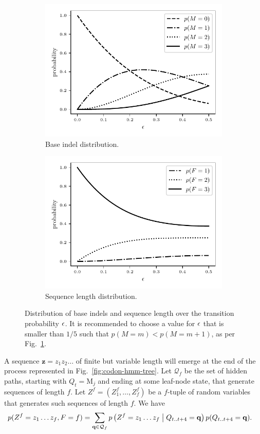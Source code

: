 \begin{figure}[htbp]
\centering
\begin{subfigure}{.5\textwidth}
  \centering
  \includegraphics[width=.7\linewidth]{indel-prob}
  \caption{Base indel distribution.}%
  \label{fig:indel-dist}
\end{subfigure}%
\begin{subfigure}{.5\textwidth}
  \centering
  \includegraphics[width=.7\linewidth]{seq-len-prob}
  \caption{Sequence length distribution.}%
  \label{fig:len-dist}
\end{subfigure}
\caption{
    Distribution of base indels and sequence length over the transition probability $\epsilon$.
    It is recommended to choose a value for $\epsilon$ that is smaller than $1/5$ such that
    $p(M=m)<p(M=m+1)$, as per Fig.~\ref{fig:indel-dist}.
}
\label{fig:dist}
\end{figure}

A sequence $\mathbf z=z_1 z_2\dots$ of finite but variable length will emerge at the end of the
process represented in Fig.~\ref{fig:codon-hmm-tree}.
Let $\mathcal Q_f$ be the set of hidden paths, starting with $Q_t=\mathrm M_j$ and ending at some leaf-node state,
that generate sequences of length $f$.
Let $Z^f=(Z^f_1, \dots, Z^f_f)$ be a $f$-tuple of random variables that generates such sequences of length $f$.
We have
\begin{align*}
    p(Z^f=z_1\dots z_f,F=f) &= \sum_{\mathbf q \in \mathcal Q_f}
    p\left(Z^f=z_1\dots z_f\;\middle|\; Q_{t..t+4}=\mathbf q\right) p(Q_{t..t+4}=\mathbf q).
\end{align*}
